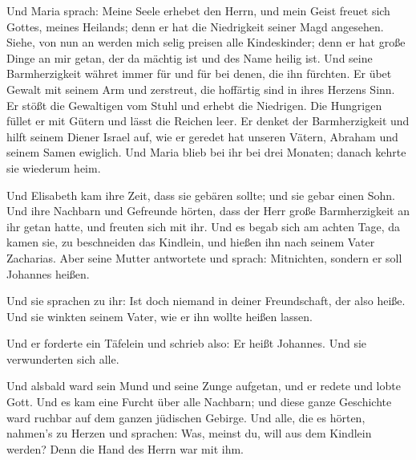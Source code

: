  Und Maria sprach: Meine Seele erhebet den Herrn,
 und mein Geist freuet sich Gottes, meines Heilands;
 denn er hat die Niedrigkeit seiner Magd angesehen.
Siehe, von nun an werden mich selig preisen alle Kindeskinder;
 denn er hat große Dinge an mir getan, der da mächtig ist
und des Name heilig ist.  Und seine Barmherzigkeit währet
immer für und für bei denen, die ihn fürchten.  Er übet
Gewalt mit seinem Arm und zerstreut, die hoffärtig sind in ihres Herzens
Sinn.  Er stößt die Gewaltigen vom Stuhl und erhebt die
Niedrigen.  Die Hungrigen füllet er mit Gütern und lässt
die Reichen leer.  Er denket der Barmherzigkeit und hilft
seinem Diener Israel auf,  wie er geredet hat unseren
Vätern, Abraham und seinem Samen ewiglich.  Und Maria
blieb bei ihr bei drei Monaten; danach kehrte sie wiederum heim.

 Und Elisabeth kam ihre Zeit, dass sie gebären sollte;
und sie gebar einen Sohn.  Und ihre Nachbarn und
Gefreunde hörten, dass der Herr große Barmherzigkeit an ihr getan hatte,
und freuten sich mit ihr.  Und es begab sich am achten
Tage, da kamen sie, zu beschneiden das Kindlein, und hießen ihn nach
seinem Vater Zacharias.  Aber seine Mutter antwortete und
sprach: Mitnichten, sondern er soll Johannes heißen.

 Und sie sprachen zu ihr: Ist doch niemand in deiner
Freundschaft, der also heiße.  Und sie winkten seinem
Vater, wie er ihn wollte heißen lassen.

 Und er forderte ein Täfelein und schrieb also: Er heißt
Johannes. Und sie verwunderten sich alle.

 Und alsbald ward sein Mund und seine Zunge aufgetan, und
er redete und lobte Gott.  Und es kam eine Furcht über
alle Nachbarn; und diese ganze Geschichte ward ruchbar auf dem ganzen
jüdischen Gebirge.  Und alle, die es hörten, nahmen's zu
Herzen und sprachen: Was, meinst du, will aus dem Kindlein werden? Denn
die Hand des Herrn war mit ihm.

